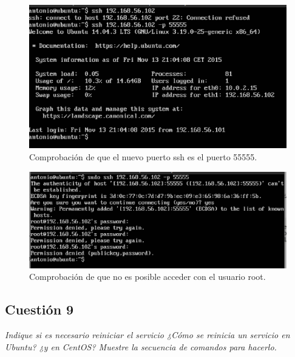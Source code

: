 \begin{figure}[H]
    \begin{center}
        \includegraphics[scale=0.6]{imagenes/img6.eps}
        \caption{Comprobación de que el nuevo puerto ssh es el puerto 55555.}
        \label{fig7}
    \end{center}
\end{figure}

\begin{figure}[H]
    \begin{center}
        \includegraphics[scale=0.6]{imagenes/img8.eps}
        \caption{Comprobación de que no es posible acceder con el usuario root.}
        \label{fig8}
    \end{center}
\end{figure}

\subsection{Cuestión 9}
\textit{Indique si es necesario reiniciar el servicio ¿Cómo se reinicia un servicio en Ubuntu? ¿y en CentOS? Muestre la secuencia de comandos para hacerlo.}
\newline

